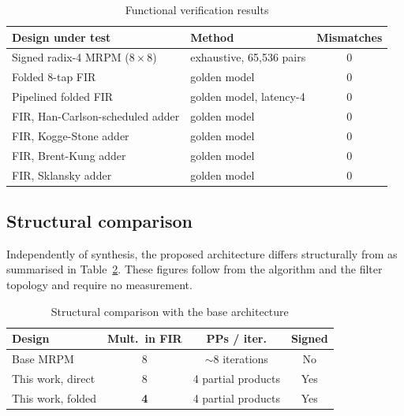\documentclass[conference]{IEEEtran}
\begin{document}
\begin{table}[t]
\caption{Functional verification results}
\label{tab:verif}
\centering
\begin{tabular}{@{}llc@{}}
\toprule
\textbf{Design under test} & \textbf{Method} & \textbf{Mismatches} \\
\midrule
Signed radix-4 MRPM ($8\times8$) & exhaustive, 65{,}536 pairs & 0 \\
Folded 8-tap FIR                 & golden model               & 0 \\
Pipelined folded FIR             & golden model, latency-4    & 0 \\
FIR, Han-Carlson-scheduled adder & golden model               & 0 \\
FIR, Kogge-Stone adder           & golden model               & 0 \\
FIR, Brent-Kung adder            & golden model               & 0 \\
FIR, Sklansky adder              & golden model               & 0 \\
\bottomrule
\end{tabular}
\end{table}

\subsection{Structural comparison}

Independently of synthesis, the proposed architecture differs
structurally from \cite{base} as summarised in Table~\ref{tab:struct}.
These figures follow from the algorithm and the filter topology and
require no measurement.

\begin{table}[t]
\caption{Structural comparison with the base architecture}
\label{tab:struct}
\centering
\begin{tabular}{@{}lccc@{}}
\toprule
\textbf{Design} & \textbf{Mult.\ in FIR} & \textbf{PPs / iter.} &
\textbf{Signed} \\
\midrule
Base MRPM \cite{base}      & 8                   & $\sim$8 iterations & No  \\
This work, direct          & 8                   & 4 partial products & Yes \\
This work, folded          & \textbf{4}          & 4 partial products & Yes \\
\bottomrule
\end{tabular}
\end{table}
\end{document}
